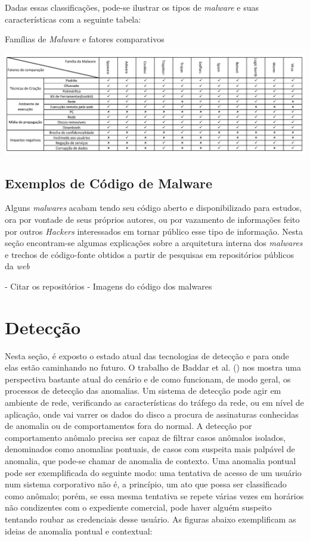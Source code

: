 Dadas essas classificações, pode-se ilustrar os tipos de \textit{malware} e suas características com a seguinte tabela:
\begin{table}[h]
\caption{\small Famílias de \textit{Malware} e fatores comparativos}
\centering
\includegraphics{figs/tabela.pdf}
\label{f.tabelamalware}
\end{table}
\subsection{Exemplos de Código de Malware} %
\label{ssub:exemplos_malware}

Alguns \textit{malwares} acabam tendo seu código aberto e disponibilizado para estudos, ora por vontade de seus próprios autores, ou por vazamento de informações feito por outros \textit{Hackers} interessados em tornar público esse tipo de informação. Nesta seção encontram-se algumas explicações sobre a arquitetura interna dos \textit{malwares} e trechos de código-fonte obtidos a partir de pesquisas em repositórios públicos da \textit{web} 

- Citar os repositórios
- Imagens do código dos malwares



\section{Detecção}
\label{s.deteccao}

Nesta seção, é exposto o estado atual das tecnologias de
detecção e para onde elas estão caminhando no futuro. O trabalho de
Baddar et al. (\citeyear{baddarxx}) nos mostra uma perspectiva bastante atual do cenário e
de como funcionam, de modo geral, os processos de detecção das anomalias. Um
sistema de detecção pode agir em ambiente de rede, verificando as
características do tráfego da rede, ou em nível de aplicação, onde vai varrer
os dados do disco a procura de assinaturas conhecidas de anomalia ou de
comportamentos fora do normal. A detecção por comportamento anômalo precisa
ser capaz de filtrar casos anômalos isolados, denominados como anomalias
pontuais, de casos com suspeita mais palpável de anomalia, que pode-se chamar de
anomalia de contexto. Uma anomalia pontual pode ser exemplificada do seguinte
modo: uma tentativa de acesso de um usuário num sistema corporativo não é, a
princípio, um ato que possa ser classificado como anômalo; porém, se essa
mesma tentativa se repete várias vezes em horários não condizentes com o
expediente comercial, pode haver alguém suspeito tentando roubar as
credenciais desse usuário. As figuras abaixo exemplificam as ideias de
anomalia pontual e contextual:

